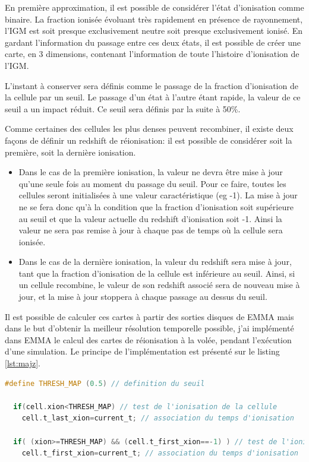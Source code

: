 En première approximation, il est possible de considérer l'état d'ionisation comme binaire.
La fraction ionisée évoluant très rapidement en présence de rayonnement, l'\ac{IGM} est soit presque exclusivement neutre soit presque exclusivement ionisé. %
En gardant l'information du passage entre ces deux états, il est possible de créer une carte, en 3 dimensions, contenant l’information de toute l'histoire d'ionisation de l'\ac{IGM}.

L'instant à conserver sera définis comme le passage de la fraction d'ionisation de la cellule par un seuil.
Le passage d'un état à l'autre étant rapide, la valeur de ce seuil a un impact réduit.
Ce seuil sera définis par la suite à 50\%.

Comme certaines des cellules les plus denses peuvent recombiner, il existe deux façons de définir un redshift de réionisation: il est possible de considérer soit la première, soit la dernière ionisation.

\begin{itemize}
\item Dans le cas de la première ionisation, la valeur ne devra être mise à jour qu'une seule fois au moment du passage du seuil.
Pour ce faire, toutes les cellules seront initialisées à une valeur caractéristique (eg -1).
La mise à jour ne se fera donc qu'à la condition que la fraction d'ionisation soit supérieure au seuil et que la valeur actuelle du redshift d'ionisation soit -1.
Ainsi la valeur ne sera pas remise à jour à chaque pas de temps où la cellule sera ionisée. 

\item Dans le cas de la dernière ionisation, la valeur du redshift sera mise à jour, tant que la fraction d'ionisation de la cellule est inférieure au seuil.
Ainsi, si un cellule recombine, le valeur de son redshift associé sera de nouveau mise à jour, et la mise à jour stoppera à chaque passage au dessus du seuil.
\end{itemize}

Il est possible de calculer ces cartes à partir des sorties disques de EMMA mais dans le but d'obtenir la meilleur résolution temporelle possible, j'ai implémenté dans EMMA le calcul des cartes de réionisation à la volée, pendant l'exécution d'une simulation.
Le principe de l'implémentation est présenté sur le listing \ref{lst:majz}.

\begin{lstlisting}[float=bth,language=c,frame=tb,caption={Mise a jour du redshift de reionisation},label=lst:majz]
  #define THRESH_MAP (0.5) // definition du seuil

  if(cell.xion<THRESH_MAP) // test de l'ionisation de la cellule
    cell.t_last_xion=current_t; // association du temps d'ionisation 

  if( (xion>=THRESH_MAP) && (cell.t_first_xion==-1) ) // test de l'ionisation de la cellule et de premiere ionisation
    cell.t_first_xion=current_t; // association du temps d'ionisation 
\end{lstlisting}

